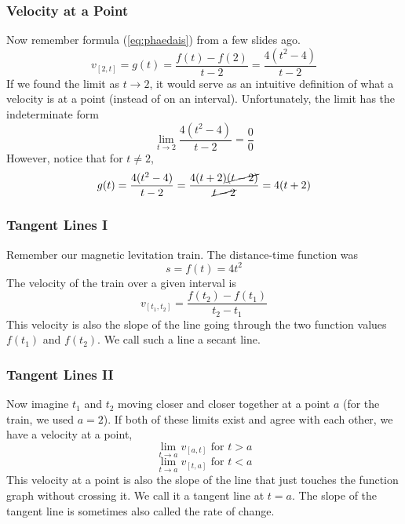 \documentclass[xcolor=dvipsnames]{beamer}
\begin{document}
\begin{frame}
  \frametitle{Velocity at a Point}
  Now remember formula (\ref{eq:phaedais}) from a few slides ago.
\begin{displaymath}
  v_{[2,t]}=g(t)=\frac{f(t)-f(2)}{t-2}=\frac{4(t^{2}-4)}{t-2}
\end{displaymath}
If we found the limit as $t\rightarrow{}2$, it would serve as an
intuitive definition of what a velocity is at a point (instead of on
an interval). Unfortunately, the limit has the \alert{indeterminate
  form}
\begin{equation}
  \label{eq:toochoir}
  \lim_{t\rightarrow{}2}\frac{4(t^{2}-4)}{t-2}=\frac{0}{0}
\end{equation}
However, notice that for $t\neq{}2$,
\begin{equation}
  \label{eq:geeshaiz}
  g(t)=\frac{4(t^{2}-4)}{t-2}=\frac{4(t+2)\cancel{(t-2)}}{\cancel{t-2}}=4(t+2)
\end{equation}
\end{frame}

\begin{frame}
  \frametitle{Tangent Lines I}
Remember our magnetic levitation train. The distance-time function was
\begin{equation}
  \label{eq:leezaach}
  s=f(t)=4t^{2}
\end{equation}
The velocity of the train over a given interval is
\begin{equation}
  \label{eq:ohgheith}
  v_{[t_{1},t_{2}]}=\frac{f(t_{2})-f(t_{1})}{t_{2}-t_{1}}
\end{equation}
This velocity is also the slope of the line going through the two
function values $f(t_{1})$ and $f(t_{2})$. We call such a line a
\alert{secant line}. 
\end{frame}

\begin{frame}
  \frametitle{Tangent Lines II}
  Now imagine $t_{1}$ and $t_{2}$ moving closer and closer together at
  a point $a$ (for the train, we used $a=2$). If both of these limits
  exist and agree with each other, we have a velocity at a point,
\begin{equation}
  \label{eq:aixohshi}
  \lim_{t\rightarrow{}a}v_{[a,t]}\mbox{ for }t>a
\end{equation}
\begin{equation}
  \label{eq:oongahgh}
  \lim_{t\rightarrow{}a}v_{[t,a]}\mbox{ for }t<a
\end{equation}
This velocity at a point is also the slope of the line that just
touches the function graph without crossing it. We call it a
\alert{tangent line} at $t=a$. The slope of the tangent line is
sometimes also called the \alert{rate of change}.
\end{frame}
\end{document}

